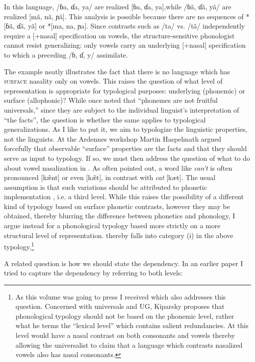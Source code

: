 \documentclass[output=paper]{langsci/langscibook}
\begin{document}
In this language, /ɓa, ɗa, ya/ are realized [ɓa, ɗa, ya],while /ɓã, ɗã, yã/ are realized [mã, nã, ɲã]. This analysis is possible because there are no sequences of *[ɓã, ɗã, yã] or *[ma, na, ɲa]. Since contrasts such as /ta/ vs. /tã/ independently require a [+nasal] specification on vowels, the structure-sensitive phonologist cannot resist generalizing: only vowels carry an underlying [+nasal] specification to which a preceding /ɓ, ɗ, y/ assimilate.

 The  example neatly illustrates the fact that there is no language which has \textsc{surface} nasality only on vowels. This raises the question of what level of representation is appropriate for typological purposes: underlying (phonemic) or surface (allophonic)? While \citet[24]{Hockett1963} once noted that “phonemes are not fruitful universals,” since they are subject to the individual linguist’s interpretation of “the facts”, the question is whether the same applies to typological generalizations. As I like to put it, we aim to typologize the linguistic properties, not the linguists. At the Ardennes workshop Martin Haspelmath argued forcefully that observable “surface” properties are the facts and that they should serve as input to typology. If so, we must then address the question of what to do about vowel nasalization in . As often pointed out, a word like \textit{can’t} is often pronounced [k{\~{æ}}nt] or even [k{\~{æ}}t], in contrast with \textit{cat} [kæt]. The usual assumption is that such variations should be attributed to phonetic implementation \citep{Cohn1993}, i.e. a third level. While this raises the possibility of a different kind of typology based on surface phonetic contrasts, however they may be obtained, thereby blurring the difference between phonetics and phonology, I argue instead for a phonological typology based more strictly on a more structural level of representation.  thereby falls into category (i) in the above typology.\footnote{ As this volume was going to press I received \citet{KiparskyToAppear} which also addresses this question. Concerned with universals and UG, Kiparsky proposes that phonological typology should not be based on the phonemic level, rather what he terms the “lexical level” which contains salient redundancies. At this level  would have a nasal contrast on both consonants and vowels thereby allowing the universalist to claim that a language which contrasts nasalized vowels also has nasal consonants.}

A related question is how we should state the dependency. In an earlier paper I tried to capture the dependency by referring to both levels:
\end{document}
